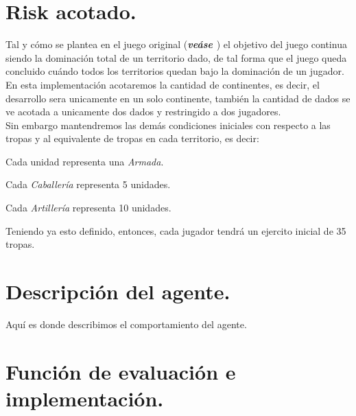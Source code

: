 \documentclass[12pt,twocolumn,draft]{article}
\begin{document}
\section{Risk acotado.}

Tal y c\'omo se plantea en el juego original (\textbf{\textit{ve\'ase \cite{RISK}}}) el objetivo del juego continua siendo la dominaci\'on total de un territorio dado, de tal forma
que el juego queda concluido cu\'ando todos los territorios quedan bajo la dominaci\'on de 
un jugador.\\
En esta implementaci\'on acotaremos la cantidad de continentes, es decir, el desarrollo sera unicamente en un solo continente, tambi\'en la cantidad de dados se ve acotada a unicamente dos dados y restringido a dos jugadores.\\

Sin embargo mantendremos las dem\'as condiciones iniciales con respecto a las tropas y al equivalente de tropas en cada territorio, es decir:
\begin{list}{*}{}
\item Cada unidad representa una \textit{Armada}.
\item Cada \textit{Caballer\'ia} representa 5 unidades.
\item Cada \textit{Artiller\'ia} representa 10 unidades.
\end{list}

Teniendo ya esto definido, entonces, cada jugador tendr\'a un ejercito inicial de 35 tropas.


\section{Descripci\'on del agente.}
Aqu\'i es donde describimos el comportamiento del agente.

\section{Funci\'on de evaluaci\'on e implementaci\'on.}
\end{document}
